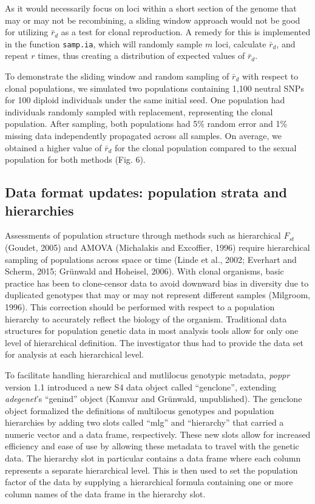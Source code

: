 \documentclass{frontiersSCNS} %
\begin{document}
As it would necessarily focus on loci within a short section of the
genome that may or may not be recombining, a sliding window approach
would not be good for utilizing \(\bar{r}_d\) as a test for clonal
reproduction. A remedy for this is implemented in the function
\texttt{samp.ia}, which will randomly sample \(m\) loci, calculate
\(\bar{r}_d\), and repeat \(r\) times, thus creating a distribution of
expected values of \(\bar{r}_d\).

To demonstrate the sliding window and random sampling of \(\bar{r}_d\)
with respect to clonal populations, we simulated two populations
containing 1,100 neutral SNPs for 100 diploid individuals under the same
initial seed. One population had individuals randomly sampled with
replacement, representing the clonal population. After sampling, both
populations had 5\% random error and 1\% missing data independently
propagated across all samples. On average, we obtained a higher value of
\(\bar{r}_d\) for the clonal population compared to the sexual
population for both methods (Fig. 6).

\subsection*{Data format updates: population strata and
hierarchies}\label{data-format-updates-population-strata-and-hierarchies}

Assessments of population structure through methods such as hierarchical
\(F_{st}\) (Goudet, 2005) and AMOVA (Michalakis and Excoffier, 1996)
require hierarchical sampling of populations across space or time (Linde
et al., 2002; Everhart and Scherm, 2015; Gr{ü}nwald and Hoheisel, 2006).
With clonal organisms, basic practice has been to clone-censor data to
avoid downward bias in diversity due to duplicated genotypes that may or
may not represent different samples (Milgroom, 1996). This correction
should be performed with respect to a population hierarchy to accurately
reflect the biology of the organism. Traditional data structures for
population genetic data in most analysis tools allow for only one level
of hierarchical definition. The investigator thus had to provide the
data set for analysis at each hierarchical level.

To facilitate handling hierarchical and mutlilocus genotypic metadata,
\emph{poppr} version 1.1 introduced a new S4 data object called
``genclone'', extending \emph{adegenet}'s ``genind'' object (Kamvar and
Grünwald, unpublished). The genclone object formalized the definitions
of multilocus genotypes and population hierarchies by adding two slots
called ``mlg'' and ``hierarchy'' that carried a numeric vector and a
data frame, respectively. These new slots allow for increased efficiency
and ease of use by allowing these metadata to travel with the genetic
data. The hierarchy slot in particular contains a data frame where each
column represents a separate hierarchical level. This is then used to
set the population factor of the data by supplying a hierarchical
formula containing one or more column names of the data frame in the
hierarchy slot.
\end{document}
